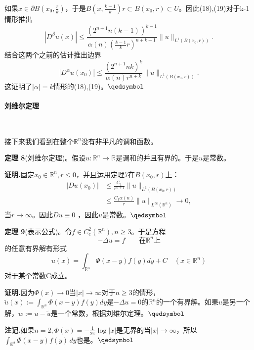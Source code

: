 \documentclass[leqno]{article}
\numberwithin{equation}{subsection}%
\begin{document}
\par
如果$x\in\partial B(x_{0},\frac{r}{k})$，于是$B(x,\frac{k-1}{k})r\subset B(x_{0},r)\subset U$。因此(18),(19)对于k-1情形推出
\begin{equation*}
|D^{\beta}u(x)|\leq \frac{\left(2^{n+1}n\left(k-1\right)\right)^{k-1}}{\alpha(n)\left(\frac{k-1}{k}r\right)^{n+k-1}}\|u\|_{L^{1}\left(B\left(x_{0},r\right)\right)}.
\end{equation*}
结合这两个之前的估计推出边界
\begin{equation}
|D^{\alpha}u(x_{0})|  \leq \frac{\left(2^{n+1}nk\right)^{k}}{\alpha(n)r^{n+k}} \|u\|_{L^{1}(B(x_{0},r))}.
\end{equation}
这证明了$|\alpha|=k$情形的(18),(19)。$\hfill\qedsymbol$



\paragraph{刘维尔定理}~{}
\par
接下来我们看到在整个$\mathbb{R}^{n}$没有非平凡的调和函数。
\par
\noindent\textbf{定理 8}(刘维尔定理)。假设$u:\mathbb{R}^{n}\rightarrow\mathbb{R}$是调和的并且有界的。于是$u$是常数。
\par
\noindent\textbf{证明.}固定$x_{0}\in\mathbb{R}^{n},r\le 0$，并且运用定理7在$B(x_{0},r)$上：
\begin{equation*}
\begin{aligned}
|Du(x_{0})|&\leq\frac{C_{1}}{r^{n+1}}\|u\|_{L^{1}(B(x_{0},r))}\\
&\leq\frac{C_{1}\alpha(n)}{r}\|u\|_{L^{\infty}(\mathbb{R}^{n})}\rightarrow 0,
\end{aligned}
\end{equation*}
当$r\rightarrow \infty$。因此$Du\equiv 0$ ，因此$u$是常数。$\hfill\qedsymbol$
\par
\noindent\textbf{定理 9}(表示公式)。令$f\in C_{c}^{2}(\mathbb{R}^{n}),n\geq 3$。于是方程
\begin{equation*}
-\Delta u=f\qquad\text{在}\mathbb{R}^{n}\text{上}
\end{equation*}
的任意有界解有形式
\begin{equation*}
u(x)=\int_{\mathbb{R}^{n}}\Phi(x-y)f(y)dy+C\quad (x\in\mathbb{R}^{n})
\end{equation*}
对于某个常数C成立。
\par
\noindent\textbf{证明.}因为$\Phi(x)\rightarrow 0$当$|x|\rightarrow\infty$对于$n\geq 3$的情形，$\tilde{u}(x):=\int_{\mathbb{R}^{n}}\Phi(x-y)f(y)dy$是$-\Delta u=0$的$\mathbb{R}^{n}$的一个有界解。如果$u$是另一个解，$w:=u-\tilde{u}$是一个常数，根据刘维尔定理。$\hfill\qedsymbol$
\par
\textbf{注记.}如果$n=2,\Phi(x)=-\frac{1}{2\pi}\log|x|$是无界的当$|x|\rightarrow\infty$，所以$\int_{\mathbb{R}^{2}}\Phi(x-y)f(y)\,dy$也是。$\hfill\qedsymbol$
\end{document}
